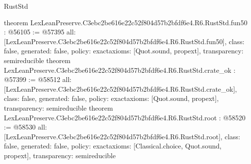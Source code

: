 \begin{lexlean}{RustStd}
\begin{coremodule}
{}
theorem LexLeanPreserve.C3ebc2be616e22c52f804d57b2bfdf6e4.R6.RustStd.fun50 : @56105 := @57395 {
  all: [LexLeanPreserve.C3ebc2be616e22c52f804d57b2bfdf6e4.R6.RustStd.fun50],
  class: false,
  generated: false,
  policy: exact{axioms: [Quot.sound, propext]},
  transparency: semireducible
}
theorem LexLeanPreserve.C3ebc2be616e22c52f804d57b2bfdf6e4.R6.RustStd.crate_ok : @57399 := @58512 {
  all: [LexLeanPreserve.C3ebc2be616e22c52f804d57b2bfdf6e4.R6.RustStd.crate_ok],
  class: false,
  generated: false,
  policy: exact{axioms: [Quot.sound, propext]},
  transparency: semireducible
}
theorem LexLeanPreserve.C3ebc2be616e22c52f804d57b2bfdf6e4.R6.RustStd.root : @58520 := @58530 {
  all: [LexLeanPreserve.C3ebc2be616e22c52f804d57b2bfdf6e4.R6.RustStd.root],
  class: false,
  generated: false,
  policy: exact{axioms: [Classical.choice, Quot.sound, propext]},
  transparency: semireducible
}


\end{coremodule}
\end{lexlean}
